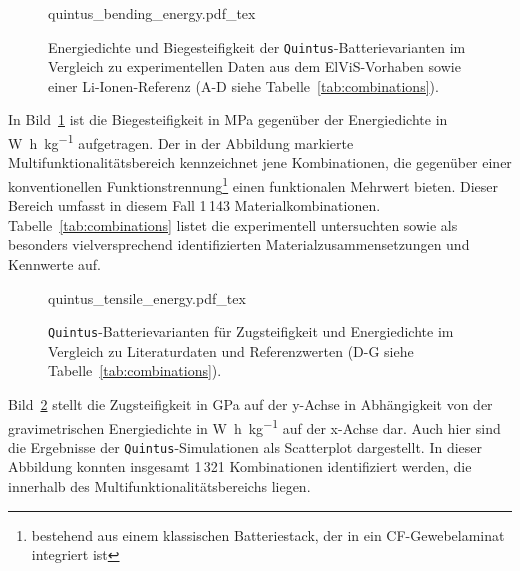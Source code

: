 \begin{figure}[!ht]
        \centering
        \def\svgwidth{\columnwidth}
        {quintus_bending_energy.pdf_tex}
        \caption{\label{fig:quintus_bending_energy}Energiedichte und Biegesteifigkeit der \texttt{Quintus}-Batterievarianten im Vergleich zu experimentellen Daten aus dem ElViS-Vorhaben sowie einer Li-Ionen-Referenz (A-D siehe Tabelle~\ref{tab:combinations}).}
\end{figure}



In Bild~\ref{fig:quintus_bending_energy} ist die Biegesteifigkeit in \unit{\mega\pascal} gegenüber der Energiedichte in \unit{\watt\hour\per\kilo\gram} aufgetragen. Der in der Abbildung markierte Multifunktionalitätsbereich kennzeichnet jene Kombinationen, die gegenüber einer konventionellen Funktionstrennung\footnote{bestehend aus einem klassischen Batteriestack, der in ein CF-Gewebelaminat integriert ist} einen funktionalen Mehrwert bieten. Dieser Bereich umfasst in diesem Fall 1\,143 Materialkombinationen. Tabelle~\ref{tab:combinations} listet die experimentell untersuchten sowie als besonders vielversprechend identifizierten Materialzusammensetzungen und Kennwerte auf.

\begin{figure}[!ht]
        \centering
        \def\svgwidth{\columnwidth}
        {quintus_tensile_energy.pdf_tex}
        \caption{\label{fig:quintus_tensile_energy}\texttt{Quintus}-Batterievarianten für Zugsteifigkeit und Energiedichte im Vergleich zu Literaturdaten und  Referenzwerten (D-G siehe Tabelle~\ref{tab:combinations}).}
\end{figure}

Bild~\ref{fig:quintus_tensile_energy} stellt die Zugsteifigkeit in \unit{\giga\pascal} auf der y-Achse in Abhängigkeit von der gravimetrischen Energiedichte in \unit{\watt\hour\per\kilo\gram} auf der x-Achse dar. Auch hier sind die Ergebnisse der \texttt{Quintus}-Simulationen als Scatterplot dargestellt. In dieser Abbildung konnten insgesamt 1\,321 Kombinationen identifiziert werden, die innerhalb des Multifunktionalitätsbereichs liegen.

